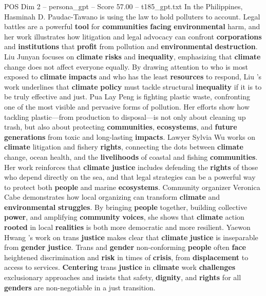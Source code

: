 \begin{textsample}{POS Dim 2 – persona\_gpt – Score 57.00 – t185\_gpt.txt}
In the Philippines, Hasminah D.
Paudac-Tawano is using the law to hold polluters to account.
Legal battles are a powerful \textbf{tool} for \textbf{communities} \textbf{facing} \textbf{environmental} harm, and her work illustrates how litigation and legal advocacy can confront \textbf{corporations} and \textbf{institutions} that \textbf{profit} from pollution and \textbf{environmental} \textbf{destruction}.
Liu Junyan focuses on \textbf{climate} \textbf{risks} and \textbf{inequality}, emphasizing that \textbf{climate} change does not affect everyone equally.
By drawing attention to who is most exposed to \textbf{climate} \textbf{impacts} and who has the least \textbf{resources} to respond, Liu ’s work underlines that \textbf{climate} \textbf{policy} must tackle structural \textbf{inequality} if it is to be truly effective and just.
Pua Lay Peng is fighting plastic waste, confronting one of the most visible and pervasive forms of pollution.
Her efforts show how tackling plastic—from production to disposal—is not only about cleaning up trash, but also about protecting \textbf{communities}, \textbf{ecosystems}, and \textbf{future} \textbf{generations} from toxic and long-lasting \textbf{impacts}.
Lawyer Sylvia Wu works on \textbf{climate} litigation and fishery \textbf{rights}, connecting the dots between \textbf{climate} change, ocean health, and the \textbf{livelihoods} of coastal and fishing \textbf{communities}.
Her work reinforces that \textbf{climate} \textbf{justice} includes defending the \textbf{rights} of those who depend directly on the sea, and that legal strategies can be a powerful way to protect both \textbf{people} and marine \textbf{ecosystems}.
Community organizer Veronica Cabe demonstrates how local organizing can transform \textbf{climate} and \textbf{environmental} \textbf{struggles}.
By bringing \textbf{people} together, building collective \textbf{power}, and amplifying \textbf{community} \textbf{voices}, she shows that \textbf{climate} action \textbf{rooted} in local \textbf{realities} is both more democratic and more resilient.
Yaewon Hwang ’s work on trans \textbf{justice} makes clear that \textbf{climate} \textbf{justice} is inseparable from \textbf{gender} \textbf{justice}.
Trans and \textbf{gender} non-conforming \textbf{people} often \textbf{face} heightened discrimination and \textbf{risk} in times of \textbf{crisis}, from \textbf{displacement} to access to services. \textbf{Centering} trans \textbf{justice} in \textbf{climate} work \textbf{challenges} exclusionary approaches and insists that safety, \textbf{dignity}, and \textbf{rights} for all \textbf{genders} are non-negotiable in a just transition.

\end{textsample}
